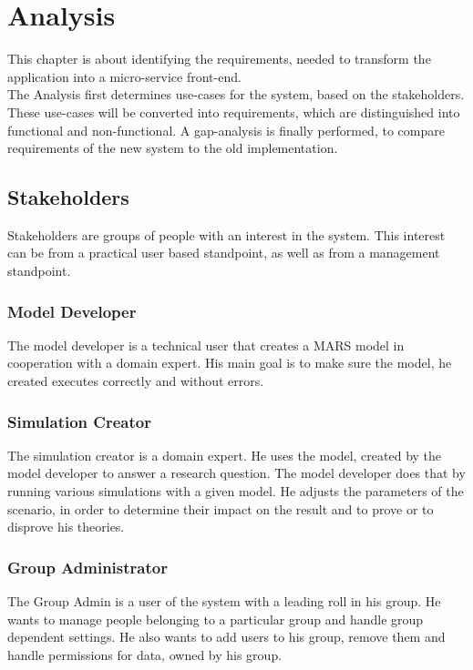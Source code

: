 
\chapter{Analysis}
This chapter is about identifying the requirements, needed to transform the application into a micro-service front-end.\\
The Analysis first determines use-cases for the system, based on the stakeholders. These use-cases will be converted into requirements, which are distinguished into functional and non-functional. A gap-analysis is finally performed, to compare requirements of the new system to the old implementation. 


\section{Stakeholders}
Stakeholders are groups of people with an interest in the system. This interest can be from a practical user based standpoint, as well as from a management standpoint.

\subsection{Model Developer}
The model developer is a technical user that creates a MARS model in cooperation with a domain expert. His main goal is to make sure the model, he created executes correctly and without errors.

\subsection{Simulation Creator}
The simulation creator is a domain expert. He uses the model, created by the model developer to answer a research question. The model developer does that by running various simulations with a given model. He adjusts the parameters of the scenario, in order to determine their impact on the result and to prove or to disprove his theories.

\subsection{Group Administrator}
The Group Admin is a user of the system with a leading roll in his group. He wants to manage people belonging to a particular group and handle group dependent settings. He also wants to add users to his group, remove them and handle permissions for data, owned by his group.


